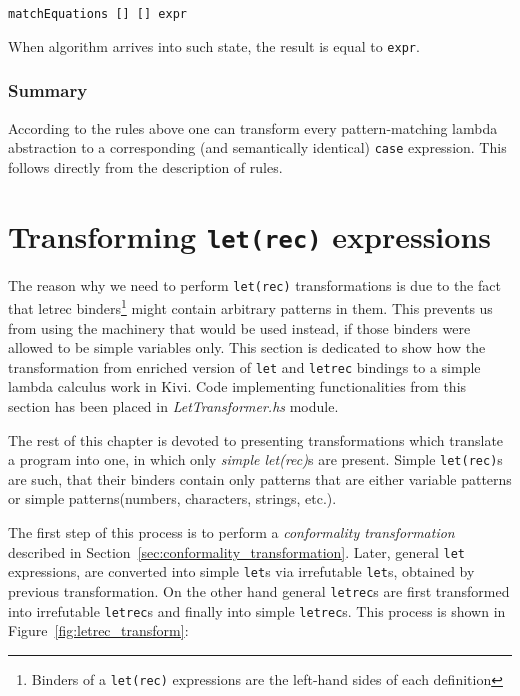 \documentclass[12pt,a4paper]{report}
\begin{document}
\hspace*{-1.5in}
\begin{lstlisting}[style=haskell]
matchEquations [] [] expr
\end{lstlisting}
When algorithm arrives into such state, the result is equal to \texttt{expr}.

\subsubsection{Summary}
According to the rules above one can transform every pattern-matching lambda
abstraction to a corresponding (and semantically identical) \texttt{case}
expression. This follows directly from the description of rules.

\section{Transforming \texttt{let(rec)} expressions}
\label{sec:letrec_transform}
The reason why we need to perform \texttt{let(rec)} transformations is due to
the fact that letrec binders\footnote{Binders of a \texttt{let(rec)}
expressions are the left-hand sides of each definition} might contain arbitrary
patterns in them. This prevents us from using the machinery that would be used
instead, if those binders were allowed to be simple variables only. This
section is dedicated to show how the transformation from enriched version of
\texttt{let} and \texttt{letrec} bindings to a simple lambda calculus work in
Kivi. Code implementing functionalities from this section has been placed in
\textit{LetTransformer.hs} module.

The rest of this chapter is devoted to presenting transformations which
translate a program into one, in which only \textit{simple let(rec)}s are
present. Simple \texttt{let(rec)}s are such, that their binders contain only
patterns that are either variable patterns or simple patterns(numbers,
characters, strings, etc.).

The first step of this process is to perform a \textit{conformality
transformation} described in Section~\ref{sec:conformality_transformation}.
Later, general \texttt{let} expressions, are converted into simple
\texttt{let}s via irrefutable \texttt{let}s, obtained by previous
transformation. On the other hand general \texttt{letrec}s are first
transformed into irrefutable \texttt{letrec}s and finally into simple
\texttt{letrec}s. This process is shown in Figure~\ref{fig:letrec_transform}:
\end{document}
